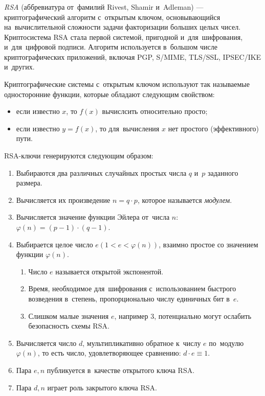 \subsubsection{}
\label{sec:analysis:research:crypto:rsa}

\emph{RSA} (аббревиатура от~фамилий Rivest, Shamir и~Adleman) — криптографический алгоритм с~открытым ключом, основывающийся на~вычислительной сложности задачи факторизации больших целых чисел. Криптосистема RSA стала первой системой, пригодной и~для~шифрования, и~для~цифровой подписи. Алгоритм используется в~большом числе криптографических приложений, включая PGP, S/MIME, TLS/SSL, IPSEC/IKE и~других\cite{wiki:rsa}.

Криптографические системы с~открытым ключом используют так называемые односторонние функции, которые обладают следующим свойством:
\begin{itemize}
	\item если известно \(x\), то \(f(x)\) вычислсить относительно просто;
	\item если известно \(y=f(x)\), то для~вычисления \(x\) нет простого (эффективного) пути.
\end{itemize}

RSA-ключи генерируются следующим образом:
\begin{enumerate}
	\item Выбираются два различных случайных простых числа \(q\) и~\(p\) заданного размера.
	\item Вычисляется их произведение \(n=q \cdot p\), которое называется \emph{модулем}.
	\item Вычисляется значение функции Эйлера от~числа \(n\): \(\varphi(n)=(p-1) \cdot (q-1)\).
	\item Выбирается целое число \(e (1 < e < \varphi(n))\), взаимно простое со значением функции \(\varphi(n)\).
	\begin{enumerate}
		\item Число \(e\) называется открытой экспонентой.
		\item Время, необходимое для~шифрования с~использованием быстрого возведения в~степень, пропорционально числу единичных бит в~\(e\).
		\item Слишком малые значения \(e\), например 3, потенциально могут ослабить безопасность схемы RSA.
	\end{enumerate}
	\item Вычисляется число \(d\), мультипликативно обратное к~числу \(e\) по~модулю  \(\varphi(n)\), то есть число, удовлетворяющее сравнению: \(d \cdot e \equiv 1\).
	\item Пара \({e,n}\) публикуется в~качестве открытого ключа RSA.
	\item Пара \({d,n}\)  играет роль закрытого ключа RSA.
\end{enumerate}


